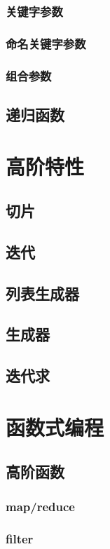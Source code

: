 \subsubsection{关键字参数}
\subsubsection{命名关键字参数}
\subsubsection{组合参数}
\subsection{递归函数}

\newpage
\section{高阶特性}
\subsection{切片}
\subsection{迭代}
\subsection{列表生成器}
\subsection{生成器}
\subsection{迭代求}

\newpage
\section{函数式编程}
\subsection{高阶函数}
\subsubsection{map/reduce}
\subsubsection{filter}
